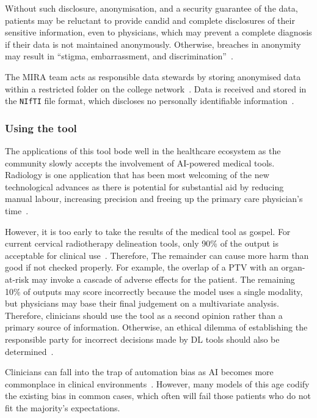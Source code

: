 \documentclass[11pt,twoside]{report}
\begin{document}
Without such disclosure, anonymisation, and a security guarantee of the data, patients may be reluctant to provide candid and complete disclosures of their sensitive information, even to physicians, which may prevent a complete diagnosis if their data is not maintained anonymously. Otherwise, breaches in anonymity may result in ``stigma, embarrassment, and discrimination''~\cite{health-privacy}.

The MIRA team acts as responsible data stewards by storing anonymised data within a restricted folder on the college network~\cite{Larson2020-ib}. Data is received and stored in the \texttt{NIfTI} file format, which discloses no personally identifiable information~\cite{gov-gdpr}.

\subsubsection{Using the tool}

The applications of this tool bode well in the healthcare ecosystem as the community slowly accepts the involvement of AI-powered medical tools. Radiology is one application that has been most welcoming of the new technological advances as there is potential for substantial aid by reducing manual labour, increasing precision and freeing up the primary care physician's time~\cite{Amisha2019-ki}.

However, it is too early to take the results of the medical tool as gospel. For current cervical radiotherapy delineation tools, only 90\% of the output is acceptable for clinical use~\cite{LIU2020172}. Therefore, The remainder can cause more harm than good if not checked properly. For example, the overlap of a PTV with an organ-at-risk may invoke a cascade of adverse effects for the patient. The remaining 10\% of outputs may score incorrectly because the model uses a single modality, but physicians may base their final judgement on a multivariate analysis. Therefore, clinicians should use the tool as a second opinion rather than a primary source of information. Otherwise, an ethical dilemma of establishing the responsible party for incorrect decisions made by DL tools should also be determined~\cite{Chen2021-dg}.

Clinicians can fall into the trap of automation bias as AI becomes more commonplace in clinical environments~\cite{STRAW2020101965}. However, many models of this age codify the existing bias in common cases, which often will fail those patients who do not fit the majority's expectations. 
\end{document}
